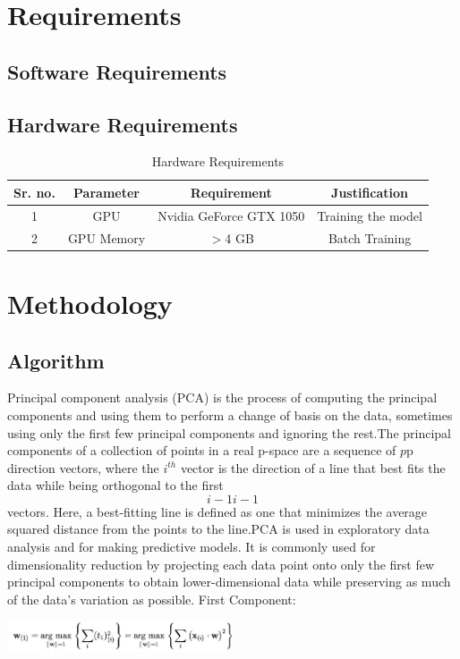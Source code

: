 \documentclass[12pt, letterpaper]{article}
\begin{document}
\section{Requirements}
\subsection{Software Requirements}


\subsection{Hardware Requirements}

\begin{table}[!htb]
\begin{center}
		\begin{tabular}{| c | c | c | c |}
		\hline
		\textbf{Sr. no.} & \textbf{Parameter} & \textbf{Requirement} & \textbf{Justification}\\
		\hline
		1 & GPU &  Nvidia GeForce GTX 1050 & Training the model \\
		\hline
		2 & GPU Memory & $>$4 GB & Batch Training\\
		\hline
		\end{tabular}
		\caption{Hardware Requirements}
\end{center}
\end{table}

\newpage
\section{Methodology}
\subsection{Algorithm}

\hspace*{0.25 in}Principal component analysis (PCA) is the process of computing the principal components and using them to perform a change of basis on the data, sometimes using only the first few principal components and ignoring the rest.The principal components of a collection of points in a real p-space are a sequence of ${\displaystyle p}$p direction vectors, where the $i^{th}$ vector is the direction of a line that best fits the data while being orthogonal to the first $${\displaystyle i-1}i-1$$ vectors. Here, a best-fitting line is defined as one that minimizes the average squared distance from the points to the line.PCA is used in exploratory data analysis and for making predictive models. It is commonly used for dimensionality reduction by projecting each data point onto only the first few principal components to obtain lower-dimensional data while preserving as much of the data's variation as possible.
First Component:
\begin{center}
             \includegraphics[width=0.5\textwidth]{figures/firstc.jpg}
\end{center}
\end{document}
